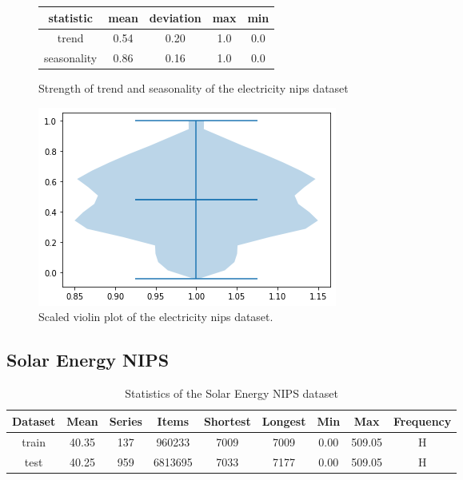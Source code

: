 \begin{figure}[htb]
    \centering
    \begin{center}
        \begin{tabular}{||c | c | c | c | c |}
            \hline
            statistic   & mean & deviation & max & min \\
            \hline
            trend       & 0.54 & 0.20      & 1.0 & 0.0 \\
            \hline
            seasonality & 0.86 & 0.16      & 1.0 & 0.0 \\
            \hline
            \hline
        \end{tabular}
        \caption{Strength of trend and seasonality of the electricity nips dataset}
    \end{center}
    \endminipage\hfill
    \includegraphics[width=\linewidth]{./img/electricity_nips_violin.png}
    \caption{Scaled violin plot of the electricity nips dataset.}
    \label{fig:electricity_nips_violin}
    \endminipage\hfill
\end{figure}

\clearpage
\subsection{Solar Energy NIPS}
\begin{table}[htb]
    \begin{tabular}{||c | c c c c c c c c ||}
        \hline
        Dataset & Mean  & Series & Items   & Shortest & Longest & Min  & Max    & Frequency \\ [0.5ex]
        \hline\hline
        train   & 40.35 & 137    & 960233  & 7009     & 7009    & 0.00 & 509.05 & H         \\
        \hline
        test    & 40.25 & 959    & 6813695 & 7033     & 7177    & 0.00 & 509.05 & H         \\
        \hline
    \end{tabular}
    \caption{Statistics of the Solar Energy NIPS dataset}
\end{table}

